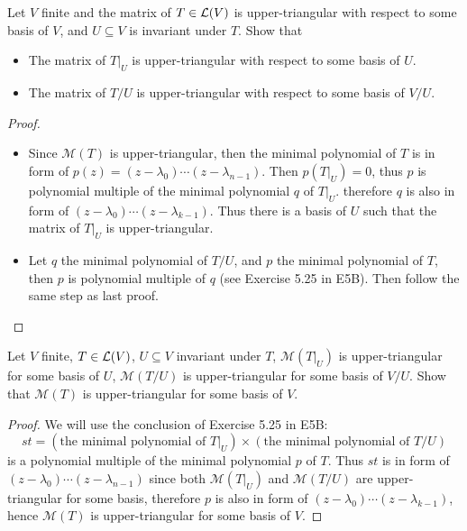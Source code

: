 \documentclass[../main.tex]{subfiles}
\begin{document}
\begin{exercise}
  Let $V$ finite and the matrix of $T \in \mathcal{L}(V)$ is upper-triangular with respect to some basis of $V$,
  and $U \subseteq V$ is invariant under $T$.
  Show that
  \begin{itemize}
    \item The matrix of $T\big|_U$ is upper-triangular with respect to some basis of $U$.
    \item The matrix of $T/U$ is upper-triangular with respect to some basis of $V/U$.
  \end{itemize}
\end{exercise}
\begin{proof}
  ~
  \begin{itemize}
    \item Since $\mathcal{M}(T)$ is upper-triangular, then the minimal polynomial of $T$
          is in form of $p(z) = (z - \lambda_0) \cdots (z - \lambda_{n - 1})$.
          Then $p(T\big|_U) = 0$, thus $p$ is polynomial multiple of the minimal polynomial $q$ of $T\big|_U$.
          therefore $q$ is also in form of $(z - \lambda_0) \cdots (z - \lambda_{k - 1})$.
          Thus there is a basis of $U$ such that the matrix of $T\big|_U$ is upper-triangular.
    \item Let $q$ the minimal polynomial of $T/U$, and $p$ the minimal polynomial of $T$, 
          then $p$ is polynomial multiple of $q$ (see Exercise 5.25 in E5B).
          Then follow the same step as last proof.
  \end{itemize}
\end{proof}

\begin{exercise}
  Let $V$ finite, $T \in \mathcal{L}(V)$, $U \subseteq V$ invariant under $T$,
  $\mathcal{M}(T\big|_U)$ is upper-triangular for some basis of $U$,
  $\mathcal{M}(T/U)$ is upper-triangular for some basis of $V/U$.
  Show that $\mathcal{M}(T)$ is upper-triangular for some basis of $V$.
\end{exercise}
\begin{proof}
  We will use the conclusion of Exercise 5.25 in E5B: 
  \[
  st = (\text{the minimal polynomial of } T\big|_U) \times (\text{the minimal polynomial of } T/U)
  \]
  is a polynomial multiple of the minimal polynomial $p$ of $T$.
  Thus $st$ is in form of $(z - \lambda_0) \cdots (z - \lambda_{n - 1})$
  since both $\mathcal{M}(T\big|_U)$ and $\mathcal{M}(T/U)$ are upper-triangular
  for some basis, therefore $p$ is also in form of $(z - \lambda_0) \cdots (z - \lambda_{k - 1})$,
  hence $\mathcal{M}(T)$ is upper-triangular for some basis of $V$.
\end{proof}
\end{document}
